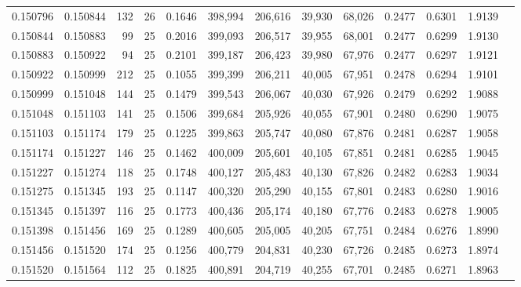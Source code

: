 \begin{tabular}{rrrrrrrrrrrrr}
0.150796 & 0.150844 &   132 &  26 &                                     0.1646 & 398,994 & 206,616 &  39,930 &  68,026 & 0.2477 & 0.6301 & 1.9139 \\
0.150844 & 0.150883 &    99 &  25 &                                     0.2016 & 399,093 & 206,517 &  39,955 &  68,001 & 0.2477 & 0.6299 & 1.9130 \\
0.150883 & 0.150922 &    94 &  25 &                                     0.2101 & 399,187 & 206,423 &  39,980 &  67,976 & 0.2477 & 0.6297 & 1.9121 \\
0.150922 & 0.150999 &   212 &  25 &                                     0.1055 & 399,399 & 206,211 &  40,005 &  67,951 & 0.2478 & 0.6294 & 1.9101 \\
0.150999 & 0.151048 &   144 &  25 &                                     0.1479 & 399,543 & 206,067 &  40,030 &  67,926 & 0.2479 & 0.6292 & 1.9088 \\
0.151048 & 0.151103 &   141 &  25 &                                     0.1506 & 399,684 & 205,926 &  40,055 &  67,901 & 0.2480 & 0.6290 & 1.9075 \\
0.151103 & 0.151174 &   179 &  25 &                                     0.1225 & 399,863 & 205,747 &  40,080 &  67,876 & 0.2481 & 0.6287 & 1.9058 \\
0.151174 & 0.151227 &   146 &  25 &                                     0.1462 & 400,009 & 205,601 &  40,105 &  67,851 & 0.2481 & 0.6285 & 1.9045 \\
0.151227 & 0.151274 &   118 &  25 &                                     0.1748 & 400,127 & 205,483 &  40,130 &  67,826 & 0.2482 & 0.6283 & 1.9034 \\
0.151275 & 0.151345 &   193 &  25 &                                     0.1147 & 400,320 & 205,290 &  40,155 &  67,801 & 0.2483 & 0.6280 & 1.9016 \\
0.151345 & 0.151397 &   116 &  25 &                                     0.1773 & 400,436 & 205,174 &  40,180 &  67,776 & 0.2483 & 0.6278 & 1.9005 \\
0.151398 & 0.151456 &   169 &  25 &                                     0.1289 & 400,605 & 205,005 &  40,205 &  67,751 & 0.2484 & 0.6276 & 1.8990 \\
0.151456 & 0.151520 &   174 &  25 &                                     0.1256 & 400,779 & 204,831 &  40,230 &  67,726 & 0.2485 & 0.6273 & 1.8974 \\
0.151520 & 0.151564 &   112 &  25 &                                     0.1825 & 400,891 & 204,719 &  40,255 &  67,701 & 0.2485 & 0.6271 & 1.8963 \\

\end{tabular}
